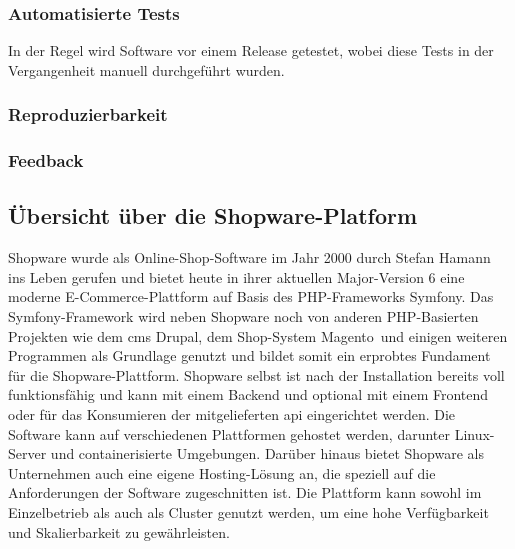 \subsubsection{Automatisierte Tests}

In der Regel wird Software vor einem Release getestet, wobei diese Tests in der Vergangenheit manuell durchgeführt
wurden.

\subsubsection{Reproduzierbarkeit}

\subsubsection{Feedback}

\subsection{Übersicht über die Shopware-Platform} \label{subsec:02-background-2}

Shopware wurde als Online-Shop-Software im Jahr 2000 durch Stefan Hamann ins Leben gerufen
und bietet heute in ihrer aktuellen Major-Version 6 eine moderne E-Commerce-Plattform auf Basis des PHP-Frameworks
\glqq Symfony\grqq.
Das Symfony-Framework wird neben Shopware noch von anderen PHP-Basierten Projekten wie dem \gls{cms} \glqq Drupal\grqq,
dem Shop-System \glqq Magento\grqq\ und einigen weiteren Programmen als Grundlage genutzt
und bildet somit ein erprobtes Fundament für die Shopware-Plattform.
Shopware selbst ist nach der Installation bereits voll funktionsfähig und kann mit einem Backend und optional
mit einem Frontend oder für das Konsumieren der mitgelieferten \gls{api} eingerichtet werden.
Die Software kann auf verschiedenen Plattformen gehostet werden, darunter Linux-Server und containerisierte Umgebungen.
Darüber hinaus bietet Shopware als Unternehmen auch eine eigene Hosting-Lösung an, die speziell auf die Anforderungen
der Software zugeschnitten ist.
Die Plattform kann sowohl im Einzelbetrieb als auch als Cluster genutzt werden, um eine hohe Verfügbarkeit und
Skalierbarkeit zu gewährleisten.

\clearpage
